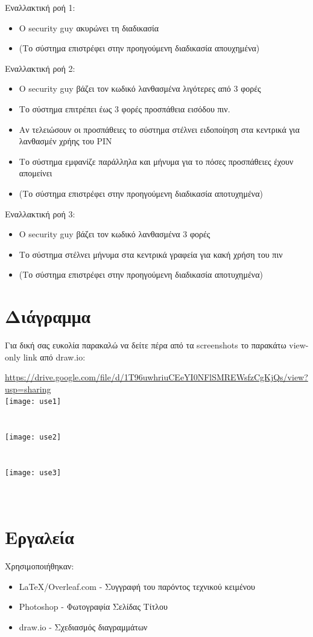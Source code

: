 \documentclass{article}
\begin{document}
\noindent Εναλλακτική ροή 1:
\begin{itemize}
    \item Ο security guy ακυρώνει τη διαδικασία
    \item (Το σύστημα επιστρέφει στην προηγούμενη διαδικασία απουχημένα)
\end{itemize}

\noindent Εναλλακτική ροή 2:
\begin{itemize}
    \item Ο security guy βάζει τον κωδικό λανθασμένα λιγότερες από 3 φορές
    \item Το σύστημα επιτρέπει έως 3 φορές προσπάθεια εισόδου πιν.
    \item Αν τελειώσουν οι προσπάθειες το σύστημα στέλνει ειδοποίηση στα κεντρικά για λανθασμέν χρήης του PIN
    \item Το σύστημα εμφανίζε παράλληλα και μήνυμα για το πόσες προσπάθειες έχουν απομείνει
    \item (Το σύστημα επιστρέφει στην προηγούμενη διαδικασία αποτυχημένα)
\end{itemize}

\noindent Εναλλακτική ροή 3:
\begin{itemize}
    \item Ο security guy βάζει τον κωδικό λανθασμένα 3 φορές
    \item Το σύστημα στέλνει μήνυμα στα κεντρικά γραφεία για κακή χρήση του πιν
    \item (Το σύστημα επιστρέφει στην προηγούμενη διαδικασία αποτυχημένα)
\end{itemize}

\section{Διάγραμμα}

Για δική σας ευκολία παρακαλώ να δείτε πέρα από τα screenshots το παρακάτω view-only link από draw.io:

\url{https://drive.google.com/file/d/1T96uwhriuCEeYI0NFlSMREWsfzCgKjQs/view?usp=sharing}
\\
\texttt{[image: use1]}\\[1ex]\\\\
\texttt{[image: use2]}\\[1ex]\\\\
\texttt{[image: use3]}\\[1ex]\\\\


\section{Εργαλεία}
Χρησιμοποιήθηκαν:
\begin{itemize}
    \item \LaTeX/Overleaf.com - Συγγραφή του παρόντος τεχνικού κειμένου
    \item Photoshop - Φωτογραφία Σελίδας Τίτλου
    \item draw.io - Σχεδιασμός διαγραμμάτων
\end{itemize}
\end{document}
